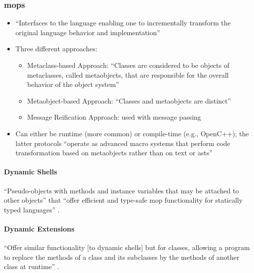 \subsubsection{\acfp{mop} \cite[p.~113:9-11]{lilis_survey_2019}}
\begin{itemize}
      \item ``Interfaces to the language enabling one to incrementally transform
            the original language behavior and implementation''
            \cite[p.~113:9]{lilis_survey_2019}
      \item Three different approaches:
            \begin{itemize}
                  \item Metaclass-based Approach: ``Classes are considered to be
                        objects of metaclasses, called metaobjects, that are
                        responsible for the overall behavior of the object
                        system'' \cite[p.~113:9]{lilis_survey_2019}
                  \item Metaobject-based Approach: ``Classes and metaobjects are
                        distinct'' \cite[p.~113:9]{lilis_survey_2019}
                  \item Message Reification Approach: used with message passing
                        \cite[p.~113:9]{lilis_survey_2019}
            \end{itemize}
      \item Can either be runtime (more common) or compile-time (e.g., OpenC++);
            the latter protocols ``operate as advanced macro systems that perform
            code transformation based on metaobjects rather than on text or
            \acsp{ast}'' \cite[p.~113:11]{lilis_survey_2019}
\end{itemize}

\paragraph{Dynamic Shells}
``Pseudo-objects with methods and instance variables that may be attached to
other objects'' that ``offer efficient and type-safe \acs{mop} functionality for
statically typed languages'' \cite[p.~113:10]{lilis_survey_2019}.

\paragraph{Dynamic Extensions}
``Offer similar functionality [to dynamic shells] but for classes, allowing a
program to replace the methods of a class and its subclasses by the methods of
another class at runtime'' \cite[p.~113:10]{lilis_survey_2019}.

